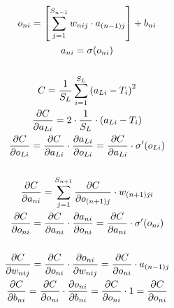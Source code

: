 \documentclass[12pt]{article}
\begin{document}
\pagebreak

\begin{gather*}
    o_{ni} = \qty[\sum_{j = 1}^{S_{n - 1}} w_{nij} \cdot a_{(n-1)j}] + b_{ni} \\
    a_{ni} = \sigma(o_{ni}) \\
    \\
    C = \frac{1}{S_L} \sum_{i=1}^{S_L} \qty(a_{Li} - T_{i})^2 \\
    \frac{\partial C}{\partial a_{Li}} = 2\cdot\frac{1}{S_L}\cdot\qty(a_{Li} - T_{i}) \\
    \frac{\partial C}{\partial o_{Li}} = \frac{\partial C}{\partial a_{Li}} \cdot \frac{\partial a_{Li}}{\partial o_{Li}} = \frac{\partial C}{\partial a_{Li}}\cdot \sigma ^\prime\qty(o_{Li}) \\
    \\
    \frac{\partial C}{\partial a_{ni}} = \sum_{j=1}^{S_{n+1}} \frac{\partial C}{\partial o_{(n+1)j}}\cdot w_{(n+1)ji}\\
    \frac{\partial C}{\partial o_{ni}} = \frac{\partial C}{\partial a_{ni}} \cdot \frac{\partial a_{ni}}{\partial o_{ni}} = \frac{\partial C}{\partial a_{ni}} \cdot \sigma ^ \prime \qty(o_{ni}) \\
    \\
    \frac{\partial C}{\partial w_{nij}} = \frac{\partial C}{\partial o_{ni}} \cdot \frac{\partial o_{ni}}{\partial w_{nij}} = \frac{\partial C}{\partial o_{ni}} \cdot a_{(n-1)j} \\
    \frac{\partial C}{\partial b_{ni}} = \frac{\partial C}{\partial o_{ni}} \cdot \frac{\partial o_{ni}}{\partial b_{ni}} = \frac{\partial C}{\partial o_{ni}} \cdot 1 = \frac{\partial C}{\partial o_{ni}}\\
\end{gather*}
\end{document}
